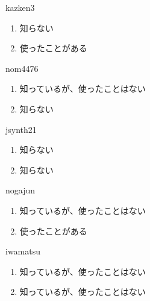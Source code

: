 \begin{prework}{ kazken3 }
  \begin{enumerate}
  \item 知らない
  \item 使ったことがある
  \end{enumerate}
\end{prework}

\begin{prework}{ nom4476 }
  \begin{enumerate}
  \item 知っているが、使ったことはない
  \item 知らない
  \end{enumerate}
\end{prework}

\begin{prework}{ jsynth21 }
  \begin{enumerate}
  \item 知らない
  \item 知らない
  \end{enumerate}
\end{prework}

\begin{prework}{ nogajun }
  \begin{enumerate}
  \item 知っているが、使ったことはない
  \item 使ったことがある
  \end{enumerate}
\end{prework}

\begin{prework}{ iwamatsu }
  \begin{enumerate}
  \item 知っているが、使ったことはない
  \item 知っているが、使ったことはない
  \end{enumerate}
\end{prework}

